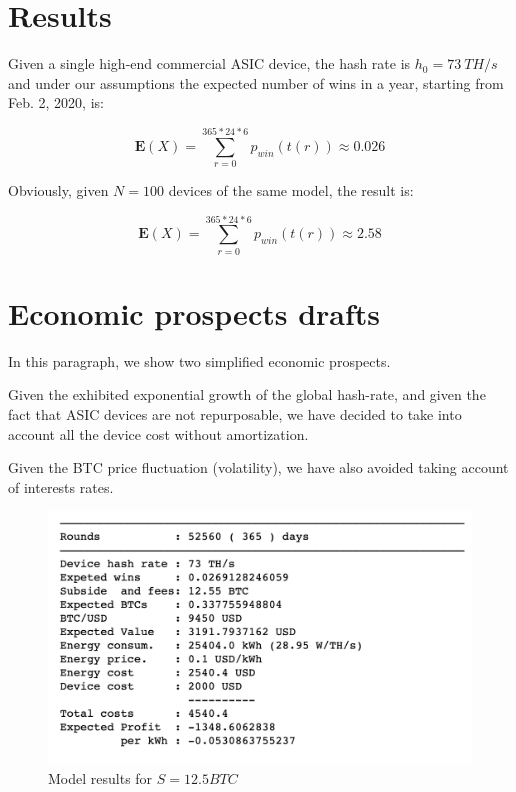 \documentclass{article}
\begin{document}
\section{Results}

Given a single high-end commercial ASIC device, the hash rate is $h_{0} = 73\ TH/s$ and under our assumptions
the expected number of wins in a year, starting from Feb. 2, 2020, is:

\begin{equation}
    \mathbf{E}(X) = \displaystyle\sum_{r=0}^{365*24*6} p_{win}(t(r)) \approx 0.026 \label{res1}
\end{equation}

Obviously, given $N=100$ devices of the same model, the result is:

\begin{equation}
    \mathbf{E}(X) = \displaystyle\sum_{r=0}^{365*24*6} p_{win}(t(r)) \approx 2.58 \label{res11}
\end{equation}

\section{Economic prospects drafts}

In this paragraph, we show two simplified economic prospects.

Given the exhibited exponential growth of the global hash-rate, and given the fact that ASIC devices are not repurposable, we have decided to take into account all the device cost without amortization.

Given the BTC price fluctuation (volatility), we have also avoided taking account of interests rates.

\begin{figure}[h]
    \centering
    \includegraphics[scale=0.50]{img/results-12.png}
    \caption{Model results for $S = 12.5 BTC$}
    \label{fig:results-12}
\end{figure}
\end{document}
